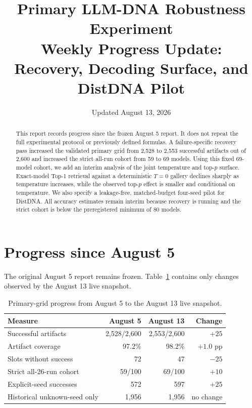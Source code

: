 \documentclass[11pt,a4paper]{article}
\title{Primary LLM-DNA Robustness Experiment\\
\large Weekly Progress Update: Recovery, Decoding Surface, and DistDNA Pilot}
\author{}
\date{Updated August 13, 2026}
\begin{document}
\maketitle

\begin{abstract}
This report records progress since the frozen August 5 report. It does not
repeat the full experimental protocol or previously defined formulas. A
failure-specific recovery pass increased the validated primary grid from
2,528 to 2,553 successful artifacts out of 2,600 and increased the strict
all-run cohort from 59 to 69 models. Using this fixed 69-model cohort, we add
an interim analysis of the joint temperature and top-$p$ surface. Exact-model
Top-1 retrieval against a deterministic $T=0$ gallery declines sharply as
temperature increases, while the observed top-$p$ effect is smaller and
conditional on temperature. We also specify a leakage-free, matched-budget
four-seed pilot for DistDNA. All accuracy estimates remain interim because
recovery is running and the strict cohort is below the preregistered minimum
of 80 models.
\end{abstract}

\section{Progress since August 5}

The original August 5 report remains frozen. Table~\ref{tab:weekly-progress}
contains only changes observed by the August 13 live snapshot.

\begin{table}[htbp]
\centering
\caption{Primary-grid progress from August 5 to the August 13 live snapshot.}
\label{tab:weekly-progress}
\begin{tabular}{lrrr}
\toprule
Measure & August 5 & August 13 & Change \\
\midrule
Successful artifacts & 2,528/2,600 & 2,553/2,600 & $+25$ \\
Artifact coverage & 97.2\% & 98.2\% & $+1.0$ pp \\
Slots without success & 72 & 47 & $-25$ \\
Strict all-26-run cohort & 59/100 & 69/100 & $+10$ \\
Explicit-seed successes & 572 & 597 & $+25$ \\
Historical unknown-seed only & 1,956 & 1,956 & no change \\
\bottomrule
\end{tabular}
\end{table}
\end{document}
